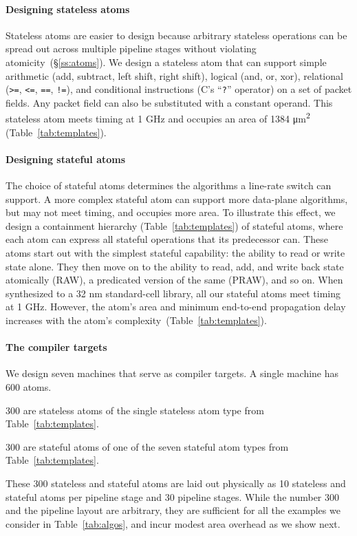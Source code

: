 \paragraph{Designing stateless atoms}
Stateless atoms are easier to design because arbitrary stateless operations can
be spread out across multiple pipeline stages without violating
atomicity~(\S\ref{ss:atoms}). We design a stateless atom that can support
simple arithmetic (add, subtract, left shift, right shift), logical (and, or,
xor), relational ({\tt >=}, {\tt <=}, {\tt ==}, {\tt !=}), and conditional
instructions (C's ``{\tt ?}'' operator) on a set of packet fields. Any packet
field can also be substituted with a constant operand. This stateless atom
meets timing at 1 GHz and occupies an area of 1384 \si{\micro\meter\squared}
(Table~\ref{tab:templates}).

\paragraph{Designing stateful atoms}
The choice of stateful atoms determines the algorithms a line-rate switch can
support. A more complex stateful atom can support more data-plane algorithms,
but may not meet timing, and occupies more area. To illustrate this effect, we
design a containment hierarchy (Table~\ref{tab:templates}) of stateful atoms,
where each atom can express all stateful operations that its predecessor can.
These atoms start out with the simplest stateful capability: the ability to
read or write state alone.  They then move on to the ability to read, add, and
write back state atomically (RAW), a predicated version of the same (PRAW), and
so on. When synthesized to a 32 nm standard-cell library, all our stateful
atoms meet timing at 1 GHz.  However, the atom's area and minimum end-to-end
propagation delay increases with the atom's
complexity~(Table~\ref{tab:templates}).

\paragraph{The compiler targets}
We design seven \absmachine machines that serve as compiler targets. A single
\absmachine machine has 600 atoms.
\begin{CompactEnumerate}
\item 300 are stateless atoms of the single stateless atom type from
Table~\ref{tab:templates}.
\item 300 are stateful atoms of one of the seven stateful atom types from
Table~\ref{tab:templates}.
\end{CompactEnumerate}
These 300 stateless and stateful atoms are laid out physically as 10 stateless
and stateful atoms per pipeline stage and 30 pipeline stages. While the number
300 and the pipeline layout are arbitrary, they are sufficient for all the
examples we consider in Table~\ref{tab:algos}, and incur modest area overhead
as we show next.

